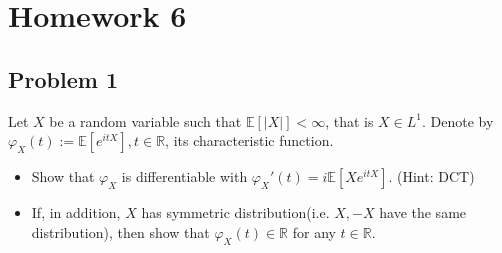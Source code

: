 \chapter{Homework 6}\label{homework-6}

\section{Problem 1}\label{hw06-problem-1}

Let \(\mathit{X}\) be a random variable such that \(\mathbb{E}\left\lbrack \left| \mathit{X} \right| \right\rbrack < \infty\), that is \(\mathit{X} \in \mathit{L}^{1}\). Denote by \(\mathit{\varphi}_{\mathit{X}}(\mathit{t}) := \mathbb{E}\left\lbrack \mathit{e}^{\mathit{i}\mathit{t}\mathit{X}} \right\rbrack,\mathit{t} \in \mathbb{R}\), its characteristic function.

\begin{itemize}
\item
  Show that \(\mathit{\varphi}_{\mathit{X}}\) is differentiable with \(\mathit{\varphi}_{\mathit{X}}'(\mathit{t}) = \mathit{i}\mathbb{E}\left\lbrack {\mathit{X}\mathit{e}^{\mathit{i}\mathit{t}\mathit{X}}} \right\rbrack\). (Hint: DCT)
\item
  If, in addition, \(\mathit{X}\) has symmetric distribution(i.e. \(\mathit{X}, - \mathit{X}\) have the same distribution), then show that \(\mathit{\varphi}_{\mathit{X}}(\mathit{t}) \in \mathbb{R}\) for any \(\mathit{t} \in \mathbb{R}\).
\end{itemize}

